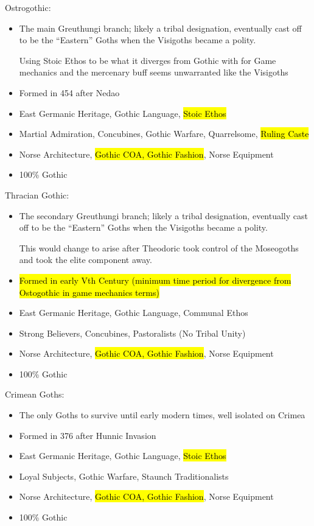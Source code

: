 \documentclass{article}
\begin{document}
	Ostrogothic:
	\begin{itemize}
		\item The main Greuthungi branch; likely a tribal designation, eventually cast off to be the “Eastern” Goths when the Visigoths became a polity.
		
		Using Stoic Ethos to be what it diverges from Gothic with for Game mechanics and the mercenary buff seems unwarranted like the Visigoths
		\item Formed in 454 after Nedao
		\item East Germanic Heritage, Gothic Language, \hl{Stoic Ethos}
		\item Martial Admiration, Concubines, Gothic Warfare, Quarrelsome, \hl{Ruling Caste}
		\item Norse Architecture, \hl{Gothic COA, Gothic Fashion}, Norse Equipment
		\item 100\% Gothic
	\end{itemize}
	
	Thracian Gothic:
	\begin{itemize}
		\item The secondary Greuthungi branch; likely a tribal designation, eventually cast off to be the “Eastern” Goths when the Visigoths became a polity.
		
		This would change to arise after Theodoric took control of the Moseogoths and took the elite component away.
		\item \hl{Formed in early Vth Century (minimum time period for divergence from Ostogothic in game mechanics terms)}
		\item East Germanic Heritage, Gothic Language, Communal Ethos
		\item Strong Believers, Concubines, Pastoralists (No Tribal Unity)
		\item Norse Architecture, \hl{Gothic COA, Gothic Fashion}, Norse Equipment
		\item 100\% Gothic
	\end{itemize}
	
	Crimean Goths:
	\begin{itemize}
		\item The only Goths to survive until early modern times, well isolated on Crimea
		\item Formed in 376 after Hunnic Invasion
		\item East Germanic Heritage, Gothic Language, \hl{Stoic Ethos}
		\item Loyal Subjects, Gothic Warfare, Staunch Traditionalists
		\item Norse Architecture, \hl{Gothic COA, Gothic Fashion}, Norse Equipment
		\item 100\% Gothic
	\end{itemize}
	
\end{document}
